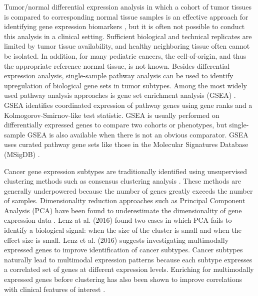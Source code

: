 \documentclass[10pt,letterpaper]{article}
\begin{document}
Tumor/normal differential expression analysis in which a cohort of tumor tissues is compared to corresponding normal tissue samples is an effective approach for identifying gene expression biomarkers \cite{andersCountbasedDifferentialExpression2013, andersDifferentialExpressionAnalysis2010, sonesonComparisonMethodsDifferential2013}, but it is often not possible to conduct this analysis in a clinical setting. Sufficient biological and technical replicates are limited by tumor tissue availability, and healthy neighboring tissue often cannot be isolated. In addition, for many pediatric cancers, the cell-of-origin, and thus the appropriate reference normal tissue, is not known. Besides differential expression analysis, single-sample pathway analysis can be used to identify upregulation of biological gene sets in tumor subtypes. Among the most widely used pathway analysis approaches is gene set enrichment analysis (GSEA) \cite{subramanianGeneSetEnrichment2005, moothaPGC1alpharesponsiveGenesInvolved2003}. GSEA identifies coordinated expression of pathway genes using gene ranks and a Kolmogorov-Smirnov-like test statistic. GSEA is usually performed on differentially expressed genes to compare two cohorts or phenotypes, but single-sample GSEA is also available when there is not an obvious comparator. GSEA uses curated pathway gene sets like those in the Molecular Signatures Database (MSigDB) \cite{liberzonMolecularSignaturesDatabase2011}.

Cancer gene expression subtypes are traditionally identified using unsupervised clustering methods such as consensus clustering analysis \cite{oyeladeClusteringAlgorithmsTheir2016,johnM3CMonteCarlo2018,wilkersonConsensusClusterPlusClassDiscovery2010a}. These methods are generally underpowered because the number of genes greatly exceeds the number of samples. Dimensionality reduction approaches such as Principal Component Analysis (PCA) have been found to underestimate the dimensionality of gene expression data \cite{lenzPrincipalComponentsAnalysis2016}. Lenz at al. (2016) found two cases in which PCA fails to identify a biological signal: when the size of the cluster is small and when the effect size is small. Lenz et al. (2016) suggests investigating multimodally expressed genes to improve identification of cancer subtypes. Cancer subtypes naturally lead to multimodal expression patterns because each subtype expresses a correlated set of genes at different expression levels. Enriching for multimodally expressed genes before clustering has also been shown to improve correlations with clinical features of interest \cite{yiliMultimodalityCriterionFeature2005}.
\end{document}
